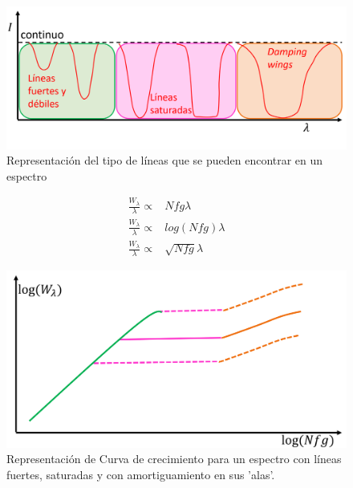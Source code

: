 \documentclass[12pt,oneside,openany,letter]{book}
\begin{document}
\begin{figure}[h]
    \centering
    \includegraphics[width=0.9\linewidth]{Images/lineas_goc.png}
    \caption{Representación del tipo de líneas que se pueden encontrar en un espectro}
    \label{fig:lines_cog}
\end{figure}

\begin{equation}
    \begin{array}{cc}
         \frac{W_{\lambda}}{\lambda} \propto& Nfg\lambda  \\
         \frac{W_{\lambda}}{\lambda} \propto& log(Nfg)\lambda  \\
         \frac{W_{\lambda}}{\lambda} \propto& \sqrt{Nfg}\lambda
    \end{array}
    \label{ec:relation_W_fg}
\end{equation}

\begin{figure}[h]
    \centering
    \includegraphics[width=0.75\linewidth]{Images/goc.png}
    \caption{Representación de Curva de crecimiento para un espectro con líneas fuertes, saturadas y con amortiguamiento en sus 'alas'.}
    \label{fig:GoC}
\end{figure}
\end{document}
